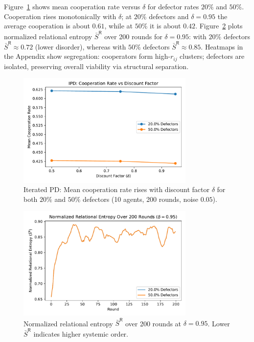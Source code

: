 \documentclass[11pt]{article}
\begin{document}
Figure~\ref{fig:ipd} shows mean cooperation rate versus $\delta$ for defector rates $20\%$ and $50\%$. Cooperation rises monotonically with $\delta$; at $20\%$ defectors and $\delta=0.95$ the average cooperation is about $0.61$, while at $50\%$ it is about $0.42$. Figure~\ref{fig:sr_over_time} plots normalized relational entropy $\bar S^{\mathsf{R}}$ over 200 rounds for $\delta=0.95$: with $20\%$ defectors $\bar S^{\mathsf{R}}\!\approx\!0.72$ (lower disorder), whereas with $50\%$ defectors $\bar S^{\mathsf{R}}\!\approx\!0.85$. Heatmaps in the Appendix show segregation: cooperators form high-$r_{ij}$ clusters; defectors are isolated, preserving overall viability via structural separation.

\begin{figure}[t]
  \centering
  \includegraphics[width=0.78\textwidth]{ipd_chart.pdf}
  \caption{Iterated PD: Mean cooperation rate rises with discount factor $\delta$ for both $20\%$ and $50\%$ defectors (10 agents, 200 rounds, noise $0.05$).}
  \label{fig:ipd}
\end{figure}

\begin{figure}[t]
  \centering
  \includegraphics[width=0.78\textwidth]{entropy_chart.pdf}
  \caption{Normalized relational entropy $\bar S^{\mathsf{R}}$ over 200 rounds at $\delta=0.95$. Lower $\bar S^{\mathsf{R}}$ indicates higher systemic order.}
  \label{fig:sr_over_time}
\end{figure}
\end{document}
